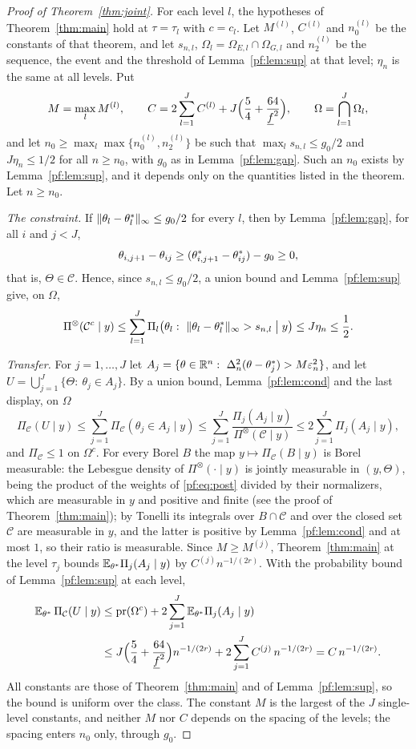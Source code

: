 \begin{proof}[Proof of Theorem~\ref{thm:joint}]
For each level $l$, the hypotheses of Theorem~\ref{thm:main} hold at $\tau=\tau_l$ with $c=c_l$. Let $M^{(l)}$, $C^{(l)}$ and $n_0^{(l)}$ be the constants of that theorem, and let $s_{n,l}$, $\Omega_l=\Omega_{E,l}\cap\Omega_{G,l}$ and $n_2^{(l)}$ be the sequence, the event and the threshold of Lemma~\ref{pf:lem:sup} at that level; $\eta_n$ is the same at all levels. Put
\[
M=\max_{l}M^{(l)},\qquad C=2\sum_{l=1}^JC^{(l)}+J\Bigl(\frac54+\frac{64}{\underline f^2}\Bigr),\qquad \Omega=\bigcap_{l=1}^J\Omega_l ,
\]
and let $n_0\ge\max_l\max\{n_0^{(l)},n_2^{(l)}\}$ be such that $\max_ls_{n,l}\le g_0/2$ and $J\eta_n\le1/2$ for all $n\ge n_0$, with $g_0$ as in Lemma~\ref{pf:lem:gap}. Such an $n_0$ exists by Lemma~\ref{pf:lem:sup}, and it depends only on the quantities listed in the theorem. Let $n\ge n_0$.

\emph{The constraint.} If $\|\theta_l-\theta^{*}_l\|_\infty\le g_0/2$ for every $l$, then by Lemma~\ref{pf:lem:gap}, for all $i$ and $j<J$,
\[
\theta_{i,j+1}-\theta_{ij}\ge(\theta^{*}_{i,j+1}-\theta^{*}_{ij})-g_0\ge0 ,
\]
that is, $\Theta\in\mathcal C$. Hence, since $s_{n,l}\le g_0/2$, a union bound and Lemma~\ref{pf:lem:sup} give, on $\Omega$,
\[
\Pi^{\otimes}(\mathcal C^c\mid y)\le\sum_{l=1}^J\Pi_l\bigl(\theta_l:\ \|\theta_l-\thetas_l\|_\infty>s_{n,l}\bigm|y\bigr)\le J\eta_n\le\frac12 .
\]

\emph{Transfer.} For $j=1,\dots,J$ let $A_j=\{\theta\in\R^n:\ \Delta_n^2(\theta-\thetas_j)>M\en^2\}$, and let $U=\bigcup_{j=1}^J\{\Theta:\ \theta_j\in A_j\}$. By a union bound, Lemma~\ref{pf:lem:cond} and the last display, on $\Omega$
\[
\Pi_{\mathcal C}(U\mid y)\le\sum_{j=1}^J\Pi_{\mathcal C}(\theta_j\in A_j\mid y)\le\sum_{j=1}^J\frac{\Pi_j(A_j\mid y)}{\Pi^{\otimes}(\mathcal C\mid y)}\le2\sum_{j=1}^J\Pi_j(A_j\mid y),
\]
and $\Pi_{\mathcal C}\le1$ on $\Omega^c$. For every Borel $B$ the map $y\mapsto\Pi_{\mathcal C}(B\mid y)$ is Borel measurable: the Lebesgue density of $\Pi^{\otimes}(\cdot\mid y)$ is jointly measurable in $(y,\Theta)$, being the product of the weights of \eqref{pf:eq:post} divided by their normalizers, which are measurable in $y$ and positive and finite (see the proof of Theorem~\ref{thm:main}); by Tonelli its integrals over $B\cap\mathcal C$ and over the closed set $\mathcal C$ are measurable in $y$, and the latter is positive by Lemma~\ref{pf:lem:cond} and at most $1$, so their ratio is measurable. Since $M\ge M^{(j)}$, Theorem~\ref{thm:main} at the level $\tau_j$ bounds $\mathbb{E}_{\theta^{*}}\Pi_j(A_j\mid y)$ by $C^{(j)}n^{-1/(2r)}$. With the probability bound of Lemma~\ref{pf:lem:sup} at each level,
\[
\begin{aligned}
\mathbb{E}_{\theta^{*}}\,\Pi_{\mathcal C}(U\mid y)&\le\mathrm{pr}(\Omega^c)+2\sum_{j=1}^J\mathbb{E}_{\theta^{*}}\Pi_j(A_j\mid y)\\
&\le J\Bigl(\frac54+\frac{64}{\underline f^2}\Bigr)n^{-1/(2r)}+2\sum_{j=1}^JC^{(j)}\,n^{-1/(2r)}=C\,n^{-1/(2r)} .
\end{aligned}
\]
All constants are those of Theorem~\ref{thm:main} and of Lemma~\ref{pf:lem:sup}, so the bound is uniform over the class. The constant $M$ is the largest of the $J$ single-level constants, and neither $M$ nor $C$ depends on the spacing of the levels; the spacing enters $n_0$ only, through $g_0$.


\end{proof}
